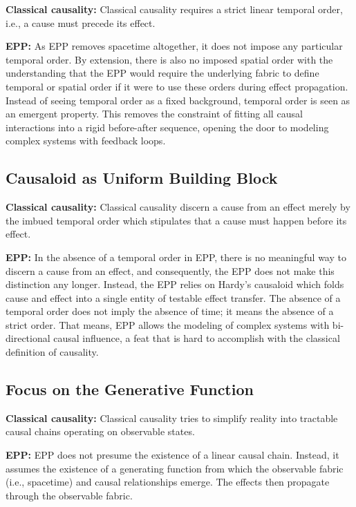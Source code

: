 \documentclass{article}
\begin{document}
\textbf{Classical causality:} 
Classical causality requires a strict linear temporal order, i.e., a cause must precede its effect.

\textbf{EPP:} 
 As EPP removes spacetime altogether, it does not impose any particular temporal order. By extension, there is also no imposed spatial order with the understanding that the EPP would require the underlying fabric to define temporal or spatial order if it were to use these orders during effect propagation.
Instead of seeing temporal order as a fixed background, temporal order is seen as an emergent property. This removes the constraint of fitting all causal interactions into a rigid before-after sequence, opening the door to modeling complex systems with feedback loops.



\subsection{Causaloid as Uniform Building Block}

\textbf{Classical causality:} 
Classical causality discern a cause from an effect merely by the imbued temporal order which stipulates that a cause must happen before its effect.


\textbf{EPP:} 
In the absence of a temporal order in EPP, there is no meaningful way to discern a cause from an effect, and consequently, the EPP does not make this distinction any longer. Instead, the EPP relies on Hardy’s causaloid which folds cause and effect into a single entity of testable effect transfer.
The absence of a temporal order does not imply the absence of time; it means the absence of a strict order. That means, EPP allows the modeling of complex systems with bi-directional causal influence, a feat that is hard to accomplish with the classical definition of causality.

\subsection{Focus on the Generative Function}

\textbf{Classical causality:} 
Classical causality tries to simplify reality into tractable causal chains operating on observable states.


\textbf{EPP:} 
EPP does not presume the existence of a linear causal chain. Instead, it assumes the existence of a generating function from which the observable fabric (i.e., spacetime) and causal relationships emerge. The effects then propagate through the observable fabric.
\end{document}
